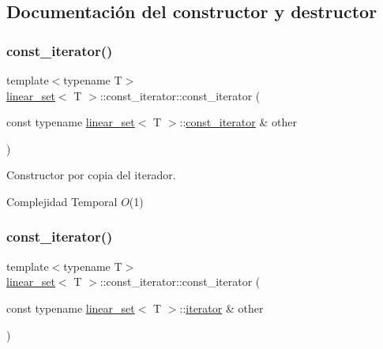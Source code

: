 \subsection{Documentación del constructor y destructor}
\mbox{\label{classlinear__set_1_1const__iterator_a14ea693ec9b2c14b9d0e4570718236cc}} 
\subsubsection{\texorpdfstring{const\+\_\+iterator()}{const\_iterator()}\hspace{0.1cm}{\footnotesize\ttfamily [1/2]}}
{\footnotesize\ttfamily template$<$typename T$>$ \\
\mbox{\hyperlink{classlinear__set}{linear\+\_\+set}}$<$ T $>$\+::const\+\_\+iterator\+::const\+\_\+iterator (\begin{DoxyParamCaption}\item[{const typename \mbox{\hyperlink{classlinear__set}{linear\+\_\+set}}$<$ T $>$\+::\mbox{\hyperlink{classlinear__set_1_1const__iterator}{const\+\_\+iterator}} \&}]{other }\end{DoxyParamCaption})}



Constructor por copia del iterador. 


\begin{DoxyDescription}
\item[Complejidad Temporal]$O$(1)
\end{DoxyDescription}\mbox{\label{classlinear__set_1_1const__iterator_af7541fcff16bc3f8b4aaa9cbfc6f4a08}} 
\subsubsection{\texorpdfstring{const\+\_\+iterator()}{const\_iterator()}\hspace{0.1cm}{\footnotesize\ttfamily [2/2]}}
{\footnotesize\ttfamily template$<$typename T$>$ \\
\mbox{\hyperlink{classlinear__set}{linear\+\_\+set}}$<$ T $>$\+::const\+\_\+iterator\+::const\+\_\+iterator (\begin{DoxyParamCaption}\item[{const typename \mbox{\hyperlink{classlinear__set}{linear\+\_\+set}}$<$ T $>$\+::\mbox{\hyperlink{classlinear__set_1_1iterator}{iterator}} \&}]{other }\end{DoxyParamCaption})}



